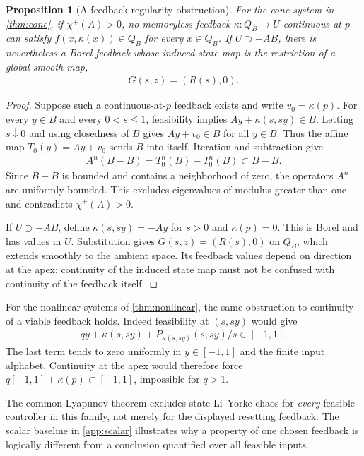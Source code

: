 \documentclass[11pt,a4paper]{article}
\newtheorem{proposition}[theorem]{Proposition}
\theoremstyle{definition}
\theoremstyle{remark}
\begin{document}
\begin{proposition}[A feedback regularity obstruction]\label{prop:feedback}
For the cone system in \cref{thm:cone}, if \(\chi^+(A)>0\), no memoryless feedback \(\kappa:Q_B\to U\) continuous at \(p\) can satisfy \(f(x,\kappa(x))\in Q_B\) for every \(x\in Q_B\). If \(U\supset -AB\), there is nevertheless a Borel feedback whose induced state map is the restriction of a global smooth map,
\begin{align*}
 G(s,z)=(R(s),0).
\end{align*}
\end{proposition}
\begin{proof}
Suppose such a continuous-at-\(p\) feedback exists and write \(v_0=\kappa(p)\). For every \(y\in B\) and every \(0<s\leq1\), feasibility implies
\(Ay+\kappa(s,sy)\in B\).
Letting \(s\downarrow0\) and using closedness of \(B\) gives \(Ay+v_0\in B\) for all \(y\in B\). Thus the affine map \(T_0(y)=Ay+v_0\) sends \(B\) into itself. Iteration and subtraction give
\begin{align*}
 A^n(B-B)=T_0^n(B)-T_0^n(B)\subset B-B.
\end{align*}
Since \(B-B\) is bounded and contains a neighborhood of zero, the operators \(A^n\) are uniformly bounded. This excludes eigenvalues of modulus greater than one and contradicts \(\chi^+(A)>0\).

If \(U\supset -AB\), define \(\kappa(s,sy)=-Ay\) for \(s>0\) and \(\kappa(p)=0\). This is Borel and has values in \(U\). Substitution gives \(G(s,z)=(R(s),0)\) on \(Q_B\), which extends smoothly to the ambient space. Its feedback values depend on direction at the apex; continuity of the induced state map must not be confused with continuity of the feedback itself.
\end{proof}

For the nonlinear systems of \cref{thm:nonlinear}, the same obstruction to continuity of a viable feedback holds. Indeed feasibility at \((s,sy)\) would give
\begin{align*}
 qy+\kappa(s,sy)+P_{\kappa(s,sy)}(s,sy)/s\in[-1,1].
\end{align*}
The last term tends to zero uniformly in \(y\in[-1,1]\) and the finite input alphabet. Continuity at the apex would therefore force \(q[-1,1]+\kappa(p)\subset[-1,1]\), impossible for \(q>1\).

The common Lyapunov theorem excludes state Li--Yorke chaos for \emph{every} feasible controller in this family, not merely for the displayed resetting feedback. The scalar baseline in \cref{app:scalar} illustrates why a property of one chosen feedback is logically different from a conclusion quantified over all feasible inputs.
\end{document}
